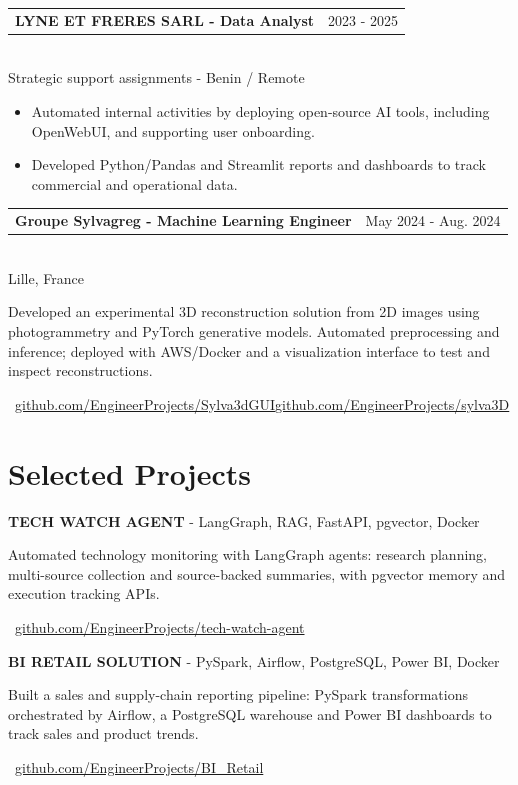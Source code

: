 \documentclass[10pt,a4paper]{article}
\makeatletter
\newcommand{\role}[3]{%
  \vspace{2.2pt}
  \begin{tabularx}{\linewidth}{@{}Xr@{}}
  \textbf{#1} & {\color{muted}#2}
  \end{tabularx}\vspace{0.8pt}\\
  {\color{muted}#3}\par
  \vspace{2pt}
}
\newcommand{\projectline}[2]{\textbf{#1} - #2\par}
\newcommand{\githublink}[2]{\par{\footnotesize\color{accent}\faIcon{github}\ \href{#1}{#2}}\par}
\newlength{\maincolumnheight}
\makeatother
\begin{document}
\begin{lrbox}{\maincolumnbox}
\begin{minipage}[t]{0.695\textwidth}
\vspace{4pt}
\role{LYNE ET FRERES SARL - Data Analyst}{2023 - 2025}{Strategic support assignments - Benin / Remote}
\begin{itemize}
  \item Automated internal activities by deploying open-source AI tools, including OpenWebUI, and supporting user onboarding.
  \item Developed Python/Pandas and Streamlit reports and dashboards to track commercial and operational data.
\end{itemize}

\vspace{4pt}
\role{Groupe Sylvagreg - Machine Learning Engineer}{May 2024 - Aug. 2024}{Lille, France}
Developed an experimental 3D reconstruction solution from 2D images using photogrammetry and PyTorch generative models. Automated preprocessing and inference; deployed with AWS/Docker and a visualization interface to test and inspect reconstructions.\par
{\fontsize{7.5pt}{9pt}\selectfont\color{accent}\ \href{https://github.com/EngineerProjects/Sylva3dGUI}{github.com/EngineerProjects/Sylva3dGUI}\enspace\textbullet\enspace\href{https://github.com/EngineerProjects/sylva3D}{github.com/EngineerProjects/sylva3D}}\par

\section{Selected Projects}
\projectline{TECH WATCH AGENT}{LangGraph, RAG, FastAPI, pgvector, Docker}
Automated technology monitoring with LangGraph agents: research planning, multi-source collection and source-backed summaries, with pgvector memory and execution tracking APIs.
\githublink{https://github.com/EngineerProjects/tech-watch-agent}{github.com/EngineerProjects/tech-watch-agent}

\vspace{4pt}
\projectline{BI RETAIL SOLUTION}{PySpark, Airflow, PostgreSQL, Power BI, Docker}
Built a sales and supply-chain reporting pipeline: PySpark transformations orchestrated by Airflow, a PostgreSQL warehouse and Power BI dashboards to track sales and product trends.
\githublink{https://github.com/EngineerProjects/BI_Retail}{github.com/EngineerProjects/BI\_Retail}

\end{minipage}
\end{lrbox}
\setlength{\maincolumnheight}{\dimexpr\ht\maincolumnbox+\dp\maincolumnbox\relax}
\addtolength{\maincolumnheight}{25pt}
\end{document}
